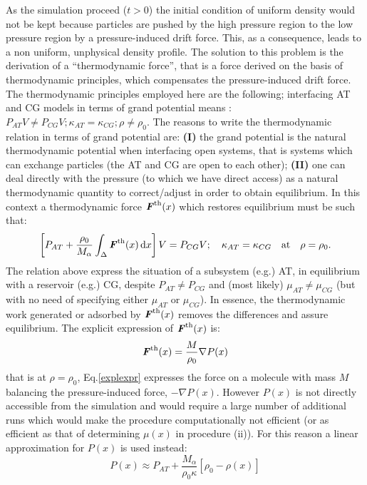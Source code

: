 \documentclass[aps,pre,preprint]{revtex4}
\renewcommand{\v}[1]{\textbf{\textit{#1}}}
\begin{document}
As the simulation proceed ($t>0$) the initial condition of uniform density would not be kept because particles are pushed by the high pressure region to the low pressure region by a pressure-induced drift force. This, as a consequence, leads to a non uniform, unphysical density profile. The solution to this problem is the derivation of a ``thermodynamic force'', that is a force derived on the basis of thermodynamic principles, which compensates the pressure-induced drift force. The thermodynamic principles employed here are the following; interfacing AT and CG models in terms of grand potential means :$P_{AT}V\neq P_{CG}V; \kappa_{AT} =  \kappa_{CG}; \rho\neq \rho_{0}$. The reasons to write the thermodynamic relation in terms of grand potential are: {\bf (I)}  the grand potential is the natural thermodynamic potential when interfacing open systems, that is systems which can exchange particles (the AT and CG are open to each other); {\bf (II)} one can deal directly with the pressure (to which we have direct access) as a natural thermodynamic quantity to correct/adjust in order to obtain equilibrium. In this context a thermodynamic force ${\v F}^{\textrm{th}}(x)$ which restores equilibrium must be such that: 
\begin{equation}
\left[P_{AT}+ \frac{\rho_{0}}{M_\alpha}\int_{\Delta} {\v F}^\text{th}(x)\,\text{d}x\right] V =P_{CG}V; \quad\kappa_{AT} =  \kappa_{CG}\quad \text{at}\quad\rho=\rho_{0}.
\label{thf}
\end{equation}
The relation above express the situation of a subsystem (e.g.) AT, in equilibrium with a reservoir (e.g.) CG, despite $P_{AT}\neq P_{CG}$ and
(most likely) $\mu_{AT}\neq\mu_{CG}$ (but with no need of specifying either $\mu_{AT}$ or $\mu_{CG}$). In essence, the thermodynamic work generated or adsorbed by ${\v F}^{\textrm{th}}(x)$ removes the differences and assure equilibrium. The explicit expression of ${\v F}^{\textrm{th}}(x)$ is:
\begin{equation}
{\v F}^{\textrm{th}}(x)=\frac{M}{\rho_{0}}\nabla P(x)
\label{explexpr}
\end{equation}
that is at $\rho=\rho_{0}$, Eq.\ref{explexpr} expresses the force on a molecule with mass $M$ balancing the pressure-induced force, $-\nabla P(x)$.
However $P(x)$ is not directly accessible from the simulation and would require a large number of additional runs which would make the procedure computationally not efficient (or as efficient as that of determining $\mu(x)$ in procedure (ii)). For this reason a linear approximation for $P(x)$ is used instead:
\begin{equation}
P(x)\approx P_{AT}+\frac{M_{\alpha}}{\rho_{0}\kappa}[\rho_{0}-\rho(x)]
\label{linearapp}
\end{equation}
\end{document}
